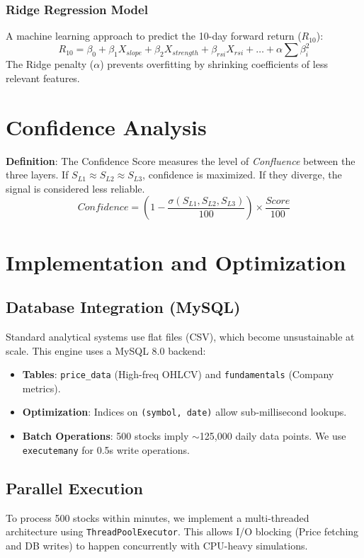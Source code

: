 \documentclass{article}
\begin{document}
\subsubsection{Ridge Regression Model}
A machine learning approach to predict the 10-day forward return ($R_{10}$):
\begin{equation}
R_{10} = \beta_0 + \beta_1 X_{slope} + \beta_2 X_{strength} + \beta_{rsi} X_{rsi} + \dots + \alpha \sum \beta_{i}^2
\end{equation}
The Ridge penalty ($\alpha$) prevents overfitting by shrinking coefficients of less relevant features.

\section{Confidence Analysis}
\textbf{Definition}: The Confidence Score measures the level of \textit{Confluence} between the three layers.
If $S_{L1} \approx S_{L2} \approx S_{L3}$, confidence is maximized. If they diverge, the signal is considered less reliable.
\begin{equation}
Confidence = \left( 1 - \frac{\sigma(S_{L1}, S_{L2}, S_{L3})}{100} \right) \times \frac{Score}{100}
\end{equation}

\section{Implementation and Optimization}
\subsection{Database Integration (MySQL)}
Standard analytical systems use flat files (CSV), which become unsustainable at scale. This engine uses a MySQL 8.0 backend:
\begin{itemize}
    \item \textbf{Tables}: \texttt{price\_data} (High-freq OHLCV) and \texttt{fundamentals} (Company metrics).
    \item \textbf{Optimization}: Indices on \texttt{(symbol, date)} allow sub-millisecond lookups.
    \item \textbf{Batch Operations}: 500 stocks imply $\sim$125,000 daily data points. We use \texttt{executemany} for 0.5s write operations.
\end{itemize}

\subsection{Parallel Execution}
To process 500 stocks within minutes, we implement a multi-threaded architecture using \texttt{ThreadPoolExecutor}. This allows I/O blocking (Price fetching and DB writes) to happen concurrently with CPU-heavy simulations.
\end{document}
